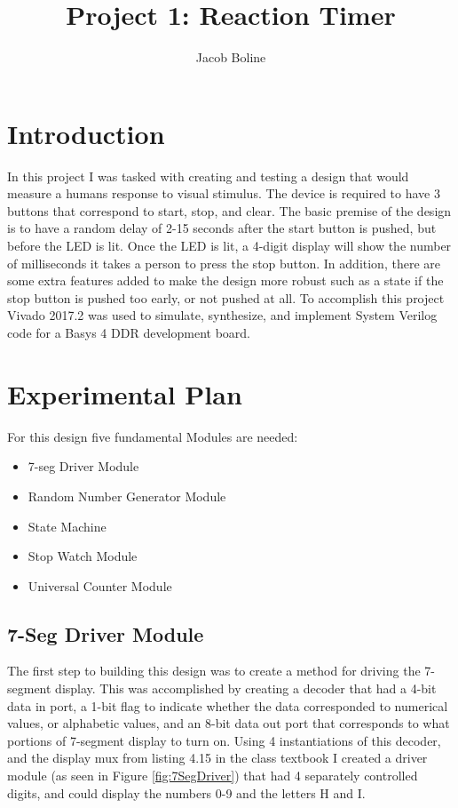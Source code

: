 \documentclass[11pt]{article}
\title{Project 1: Reaction Timer}
\author{Jacob Boline}
\begin{document}
\maketitle

\section{Introduction}
In this project I was tasked with creating and testing a design that would measure a humans response to visual stimulus. The device is required to have 3 buttons that correspond to start, stop, and clear. The basic premise of the design is to have a random delay of 2-15 seconds after the start button is pushed, but before the LED is lit. Once the LED is lit, a 4-digit display will show the number of milliseconds it takes a person to press the stop button. In addition, there are some extra features added to make the design more robust such as a state if the stop button is pushed too early, or not pushed at all. To accomplish this project Vivado 2017.2 was used to simulate, synthesize, and implement System Verilog code for a Basys 4 DDR development board.

\section{Experimental Plan}
For this design five fundamental Modules are needed:
\begin{itemize}
    \item 7-seg Driver Module
    \item Random Number Generator Module
    \item State Machine
    \item Stop Watch Module
    \item Universal Counter Module
\end{itemize}

\subsection{7-Seg Driver Module}
The first step to building this design was to create a method for driving the 7-segment display. This was accomplished by creating a decoder that had a 4-bit data in port, a 1-bit flag to indicate whether the data corresponded to numerical values, or alphabetic values, and an 8-bit data out port that corresponds to what portions of 7-segment display to turn on. Using 4 instantiations of this decoder, and the display mux from listing 4.15 in the class textbook I created a driver module (as seen in Figure \ref{fig:7SegDriver}) that had 4 separately controlled digits, and could display the numbers 0-9 and the letters H and I.
\end{document}
